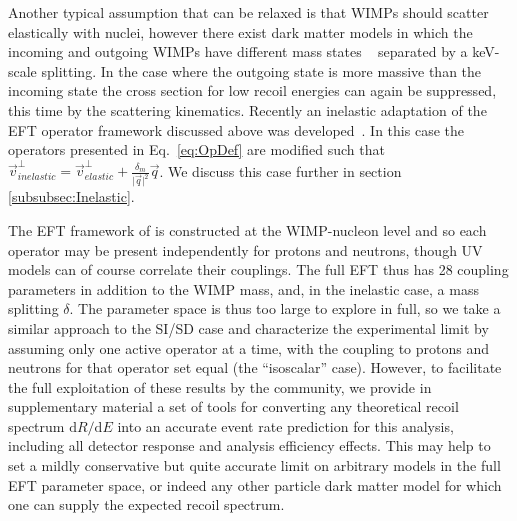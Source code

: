 	    Another typical assumption that can be relaxed is that WIMPs should scatter elastically with nuclei, however there exist dark matter models in which the incoming and outgoing WIMPs have different mass states ~\cite{InelasticIntro} separated by a keV-scale splitting. In the case where the outgoing state is more massive than the incoming state the cross section for low recoil energies can again be suppressed, this time by the scattering kinematics. Recently an inelastic adaptation of the EFT operator framework discussed above was developed~\cite{InelasticMath}. In this case the operators presented in Eq.~\ref{eq:OpDef} are modified such that $\vec{v}^\perp_{inelastic} = \vec{v}^\perp_{elastic} +\frac{\delta_m}{\vert{\vec{q}}\vert^2}\vec{q}$. We discuss this case further in section \ref{subsubsec:Inelastic}.
	    
The EFT framework of \cite{Fitzpatrick:2012ib} is constructed at the WIMP-nucleon level and so each operator may be present independently for protons and neutrons, though UV models can of course correlate their couplings. The full EFT thus has 28 coupling parameters in addition to the WIMP mass, and, in the inelastic case, a mass splitting $\delta$. The parameter space is thus too large to explore in full, so we take a similar approach to the SI/SD case and characterize the experimental limit by assuming only one active operator at a time, with the coupling to protons and neutrons for that operator set equal (the ``isoscalar'' case). However, to facilitate the full exploitation of these results by the community, we provide in supplementary material a set of tools for converting any theoretical recoil spectrum $\mathrm{d}R/\mathrm{d}E$ into an accurate event rate prediction for this analysis, including all detector response and analysis efficiency effects. This may help to set a mildly conservative but quite accurate limit on arbitrary models in the full EFT parameter space, or indeed any other particle dark matter model for which one can supply the expected recoil spectrum.

